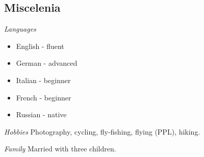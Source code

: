 \documentclass[margin, 10pt]{res}
\begin{document}
\begin{resume}
\section{Miscelenia}
{\sl Languages}
\begin{itemize}
\item English - fluent 
\item German - advanced 
\item Italian - beginner 
\item French - beginner
\item Russian - native
\end{itemize} 

{\sl Hobbies}
Photography, cycling, fly-fishing, flying (PPL), hiking.

{\sl Family}
Married with three children.

\end{resume}
\end{document}
